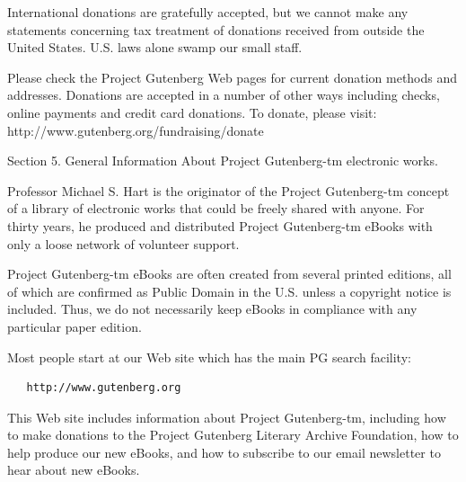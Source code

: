 \documentclass[12pt,oneside]{scrbook}
\begin{document}
  International donations are gratefully accepted, but we cannot make any
  statements concerning tax treatment of donations received from outside
  the United States. U.S. laws alone swamp our small staff.
  
  Please check the Project Gutenberg Web pages for current donation
  methods and addresses. Donations are accepted in a number of other ways
  including checks, online payments and credit card donations. To donate,
  please visit: http://www.gutenberg.org/fundraising/donate
  
  Section 5. General Information About Project Gutenberg-tm electronic
  works.
  
  Professor Michael S. Hart is the originator of the Project Gutenberg-tm
  concept of a library of electronic works that could be freely shared
  with anyone. For thirty years, he produced and distributed Project
  Gutenberg-tm eBooks with only a loose network of volunteer support.
  
  Project Gutenberg-tm eBooks are often created from several printed
  editions, all of which are confirmed as Public Domain in the U.S. unless
  a copyright notice is included. Thus, we do not necessarily keep eBooks
  in compliance with any particular paper edition.
  
  Most people start at our Web site which has the main PG search facility:
  
  \begin{verbatim}
   http://www.gutenberg.org
  \end{verbatim}
  
  This Web site includes information about Project Gutenberg-tm, including
  how to make donations to the Project Gutenberg Literary Archive
  Foundation, how to help produce our new eBooks, and how to subscribe to
  our email newsletter to hear about new eBooks.
  
\end{document}
